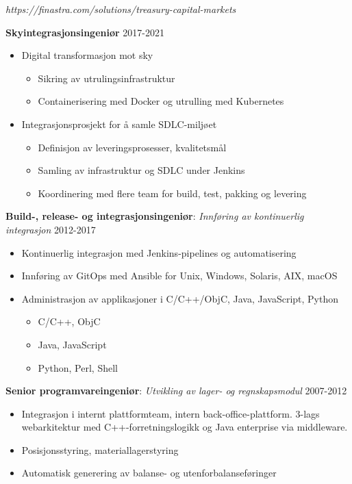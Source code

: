 \documentclass[11pt,a4paper]{moderncv}
\begin{document}
{
\textit{https://finastra.com/solutions/treasury-capital-markets}
\bigskip

\textbf{Skyintegrasjonsingeniør} \hfill 2017-2021
\bigskip
	\begin{itemize}%
		\item Digital transformasjon mot sky
			\begin{itemize}%
				\item Sikring av utrulingsinfrastruktur
				\item Containerisering med Docker og utrulling med Kubernetes
			\end{itemize}
	\end{itemize}
\bigskip
	\begin{itemize}%
	\item	Integrasjonsprosjekt for å samle SDLC-miljøet
		\begin{itemize}%
				\item Definisjon av leveringsprosesser, kvalitetsmål
				\item Samling av infrastruktur og SDLC under Jenkins
				\item Koordinering med flere team for build, test, pakking og levering
		\end{itemize}
	\end{itemize}
\bigskip
 \textbf{Build-, release- og integrasjonsingeniør}: \textit{Innføring av kontinuerlig integrasjon} \hfill 2012-2017
\bigskip
			\begin{itemize}%
				\item Kontinuerlig integrasjon med Jenkins-pipelines og automatisering
                \item Innføring av GitOps med Ansible for Unix, Windows, Solaris, AIX, macOS
				\item Administrasjon av applikasjoner i C/C++/ObjC, Java, JavaScript, Python
					\begin{itemize}
						\item C/C++, ObjC
						\item Java, JavaScript
						\item Python, Perl, Shell
					\end{itemize}
				\end{itemize}
\bigskip
\textbf{Senior programvareingeniør}: \textit{Utvikling av lager- og regnskapsmodul} \hfill 2007-2012

\bigskip
			\begin{itemize}
				\item Integrasjon i internt plattformteam, intern back-office-plattform. 3-lags webarkitektur med C++-forretningslogikk og Java enterprise via middleware.
				\item Posisjonsstyring, materiallagerstyring
				\item Automatisk generering av balanse- og utenforbalanseføringer
			\end{itemize}
}
\end{document}
